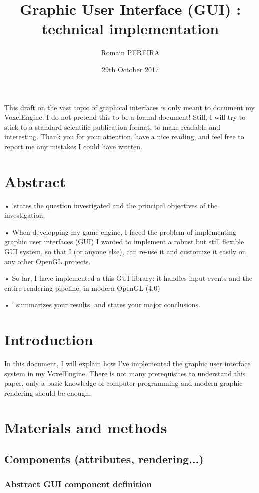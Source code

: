 \documentclass[11pt]{article}
\title{Graphic User Interface (GUI) : technical implementation}
\author{Romain PEREIRA}
\date{29th October 2017}
\begin{document}
	\maketitle
	This draft on the vast topic of graphical interfaces is only meant to document my VoxelEngine. I do not pretend this to be a formal document! Still, I will try to stick to a standard scientific publication format, to make readable and interesting.
	\newline
	\newline
	Thank you for your attention, have a nice reading, and feel free to report me any mistakes I could have written.
	\tableofcontents
	\newpage

	\section*{Abstract}
	
	• `states the question investigated and the principal objectives of the investigation,

	• When developping my game engine, I faced the problem of implementing graphic user interfaces (GUI)
	I wanted to implement a robust but still flexible GUI system, so that I (or anyone else), can re-use it and customize it easily on any other OpenGL projects.
	
	• So far, I have implemented a this GUI library: it handles input events and the entire rendering pipeline, in modern OpenGL (4.0)

	• ` summarizes your results, and  states your major conclusions.
	
	\newpage

	\section{Introduction}
	In this document, I will explain how I've implemented the graphic user interface system in my VoxelEngine.
	There is not many prerequisites to understand this paper, only a basic knowledge of computer programming and modern graphic rendering should be enough.
	\newpage

	\section{Materials and methods}
		\subsection{Components (attributes, rendering...)}
			\subsubsection{Abstract GUI component definition}
\end{document}
